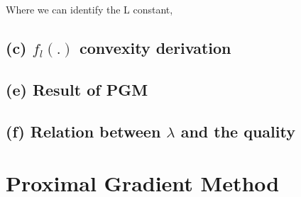 \documentclass{article}
\begin{document}
Where we can identify the L constant, 

\subsection*{(c) $f_{l}(.)$ convexity derivation}
\subsection*{(e) Result of PGM}
\subsection*{(f) Relation between $\lambda$ and the quality}

\section*{Proximal Gradient Method}
\end{document}
